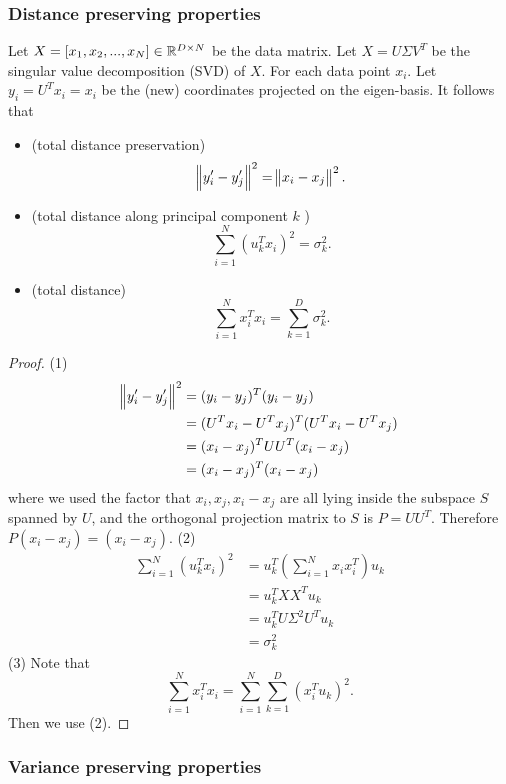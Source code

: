 \begin{refsection}
\subsubsection{Distance preserving properties}


\begin{theorem}
	Let $X = [x_1,x_2,...,x_N] \in \mathbb{R}^{D\times N}$ be the data matrix. Let $X = U\Sigma V^T$ be the singular value decomposition (SVD) of $X$. For each data point $x_i$. Let $y_i = U^Tx_i = x_i$ be the (new) coordinates projected on the eigen-basis. 
It follows that
\begin{itemize}
	\item (total distance preservation)
	$$\norm{y_i' - y_j'}^2 = \norm{x_i - x_j}^2.$$
	\item (total distance along principal component $k$ )  
	$$ \sum_{i=1}^N (u_k^Tx_i)^2 = \sigma_k^2.$$
	\item (total distance)  
	$$ \sum_{i=1}^N x_i^Tx_i = \sum_{k=1}^D \sigma_k^2.$$
\end{itemize}
\end{theorem}
\begin{proof}
(1)
\begin{align*}
\norm{y_i' - y_j'}^2 &= (y_i - y_j)^T(y_i-y_j) \\
					 &= (U^Tx_i-U^Tx_j)^T(U^Tx_i-U^Tx_j)\\
					 &= (x_i-x_j)^TUU^T(x_i-x_j)\\
					 &= (x_i-x_j)^T(x_i-x_j)
\end{align*}	
where we used the factor that $x_i, x_j, x_i-x_j$ are all lying inside the subspace $S$ spanned by $U$, and the orthogonal projection matrix to $S$ is $P=UU^T$. Therefore $P(x_i-x_j) = (x_i-x_j)$. 
(2)
\begin{align*}
\sum_{i=1}^N (u_k^Tx_i)^2 &= u_k^T(\sum_{i=1}^N x_ix_i^T) u_k \\
                          &= u_k^T XX^T u_k \\
                          &= u_k^T U\Sigma^2 U^T u_k \\
                          &= \sigma_k^2 
\end{align*}
(3) Note that $$ \sum_{i=1}^N x_i^Tx_i = \sum_{i=1}^N \sum_{k=1}^D (x_i^Tu_k)^2.$$
Then we use (2).
\end{proof}

\subsubsection{Variance preserving properties}



\end{refsection}
